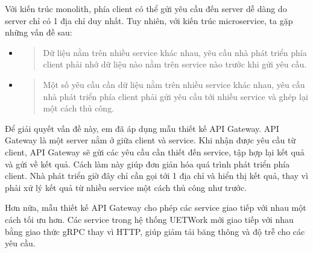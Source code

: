 \documentclass[./../main.tex]{subfiles}
\begin{document}
Với kiến trúc monolith, phía client có thể gửi yêu cầu đến server dễ
dàng do server chỉ có 1 địa chỉ duy nhất. Tuy nhiên, với kiến trúc
microservice, ta gặp những vấn đề sau:

\begin{itemize}
\item
  \begin{quote}
  Dữ liệu nằm trên nhiều service khác nhau, yêu cầu nhà phát triển phía
  client phải nhớ dữ liệu nào nằm trên service nào trước khi gửi yêu
  cầu.
  \end{quote}
\item
  \begin{quote}
  Một số yêu cầu cần dữ liệu nằm trên nhiều service khác nhau, yêu cầu
  nhà phát triển phía client phải gửi yêu cầu tới nhiều service và ghép
  lại một cách thủ công.
  \end{quote}
\end{itemize}

Để giải quyết vấn đề này, em đã áp dụng mẫu thiết kế API Gateway. API
Gateway là một server nằm ở giữa client và service. Khi nhận được yêu
cầu từ client, API Gateway sẽ gửi các yêu cầu cần thiết đến service, tập
hợp lại kết quả và gửi về kết quả. Cách làm này giúp đơn giản hóa quá
trình phát triển phía client. Nhà phát triển giờ đây chỉ cần gọi tới 1
địa chỉ và hiển thị kết quả, thay vì phải xử lý kết quả từ nhiều service
một cách thủ công như trước.

Hơn nữa, mẫu thiết kế API Gateway cho phép các service giao tiếp với
nhau một cách tối ưu hơn. Các service trong hệ thống UETWork mới giao
tiếp với nhau bằng giao thức gRPC thay vì HTTP, giúp giảm tải băng thông
và độ trễ cho các yêu cầu.
\end{document}
